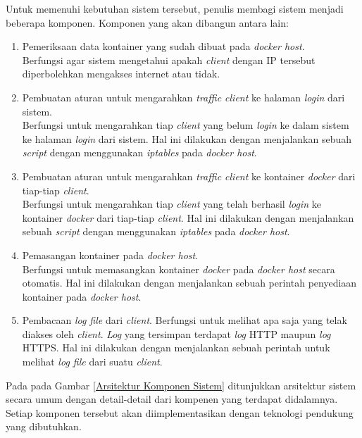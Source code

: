       \indent Untuk memenuhi kebutuhan sistem tersebut, penulis membagi sistem menjadi beberapa komponen. Komponen yang akan dibangun antara lain: 
      \begin{enumerate} 
	  \item Pemeriksaan data kontainer yang sudah dibuat pada \textit{docker host}.\\
		  Berfungsi agar sistem mengetahui apakah \textit{client} dengan IP tersebut diperbolehkan mengakses internet atau tidak.
	  \item Pembuatan aturan untuk mengarahkan \textit{traffic client} ke halaman \textit{login} dari sistem.\\
		  Berfungsi untuk mengarahkan tiap \textit{client} yang belum \textit{login} ke dalam sistem ke halaman \textit{login} dari sistem. Hal ini dilakukan dengan menjalankan sebuah \textit{script} dengan menggunakan \textit{iptables} pada \textit{docker host}.
	  \item Pembuatan aturan untuk mengarahkan \textit{traffic client} ke kontainer \textit{docker} dari tiap-tiap \textit{client}.\\
		  Berfungsi untuk mengarahkan tiap \textit{client} yang telah berhasil \textit{login} ke kontainer \textit{docker} dari tiap-tiap \textit{client}. Hal ini dilakukan dengan menjalankan sebuah \textit{script} dengan menggunakan \textit{iptables} pada \textit{docker host}.
	  \item Pemasangan kontainer pada \textit{docker host}.\\
		  Berfungsi untuk memasangkan kontainer \textit{docker} pada \textit{docker host} secara otomatis. Hal ini dilakukan dengan menjalankan sebuah perintah penyediaan kontainer pada \textit{docker host}.
	  \item Pembacaan \textit{log file} dari \textit{client}.
		  Berfungsi untuk melihat apa saja yang telak diakses oleh \textit{client}. \textit{Log} yang tersimpan terdapat \textit{log} HTTP maupun \textit{log} HTTPS. Hal ini dilakukan dengan menjalankan sebuah perintah untuk melihat \textit{log file} dari suatu \textit{client}.
        
      \end{enumerate}
      \indent Pada pada Gambar \ref{Arsitektur Komponen Sistem} ditunjukkan arsitektur sistem secara umum dengan detail-detail dari kompenen yang terdapat didalamnya. Setiap komponen tersebut akan diimplementasikan dengan teknologi pendukung yang dibutuhkan.\\
      
